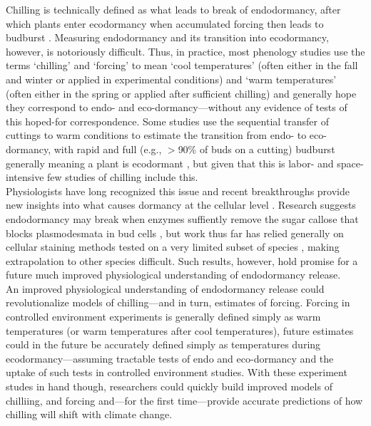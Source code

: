 \documentclass[11pt,letter]{article}
\begin{document}
Chilling is technically defined as what leads to break of endodormancy, after which plants enter ecodormancy when accumulated forcing then leads to budburst \citep{chuine2016}. Measuring endodormancy and its transition into ecodormancy, however, is notoriously difficult. Thus, in practice, most phenology studies use the terms `chilling' and `forcing' to mean `cool temperatures' (often either in the fall and winter or applied in experimental conditions) and `warm temperatures' (often either in the spring or applied after sufficient chilling) and generally hope they correspond to endo- and eco-dormancy---without any evidence of tests of this hoped-for correspondence. Some studies use the sequential transfer of cuttings to warm conditions to estimate the transition from endo- to eco-dormancy, with rapid and full (e.g., $>$90\% of buds on a cutting) budburst generally meaning a plant is ecodormant \citep[e.g.,][]{Junttila:2012aa}, but given that this is labor- and space-intensive few studies of chilling include this. \\

Physiologists have long recognized this issue and recent breakthroughs provide new insights into what causes dormancy at the cellular level \citep{vanderschoot2014}. Research suggests endodormancy may break when enzymes suffiently remove the sugar callose that blocks plasmodesmata in bud cells \citep[reviewed in][]{chang2021}, but work thus far has relied generally on cellular staining methods tested on a very limited subset of species \citep{rinne2011,singh2019}, making extrapolation to other species difficult. Such results, however, hold promise for a future much improved physiological understanding of endodormancy release.\\

An improved physiological understanding of endodormancy release could revolutionalize models of chilling---and in turn, estimates of forcing. Forcing in controlled environment experiments is generally defined simply as warm temperatures (or warm temperatures after cool temperatures), future estimates could in the future be accurately defined simply as temperatures during ecodormancy---assuming tractable tests of endo and eco-dormancy and the uptake of such tests in controlled environment studies. With these experiment studes in hand though, researchers could quickly build improved models of chilliing, and forcing and---for the first time---provide accurate predictions of how chilling will shift with climate change.\\ 
\end{document}
